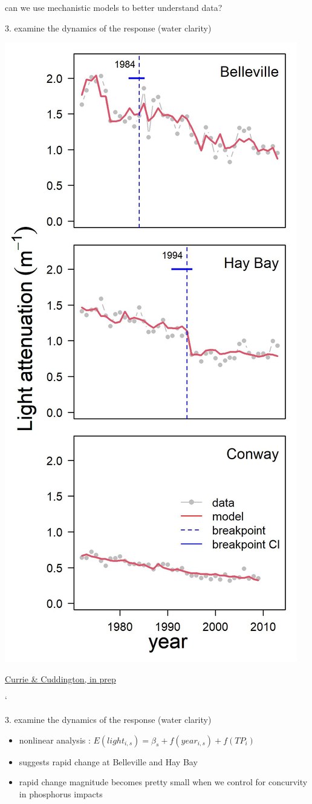 \documentclass[
  ignorenonframetext,
]{beamer}
\providecommand{\tightlist}{%
  \setlength{\itemsep}{0pt}\setlength{\parskip}{0pt}}
\begin{document}
\begin{frame}{can we use mechanistic models to better understand data?}
\begin{block}{3. examine the dynamics of the response (water clarity)}
\begin{center}\includegraphics[width=0.5\linewidth]{lightbreakwgt} \end{center}

\href{}{Currie \& Cuddington, in prep}

`
\end{block}

\begin{block}{3. examine the dynamics of the response (water clarity)}
\protect\hypertarget{examine-the-dynamics-of-the-response-water-clarity}{}
\begin{itemize}
\tightlist
\item
  nonlinear analysis : \(E(light_{i,s})=β_s+f(year_{i,s})+f(TP_i)\)
\item
  suggests rapid change at Belleville and Hay Bay
\item
  rapid change magnitude becomes pretty small when we control for
  concurvity in phosphorus impacts
\end{itemize}


\end{block}
\end{frame}
\end{document}
